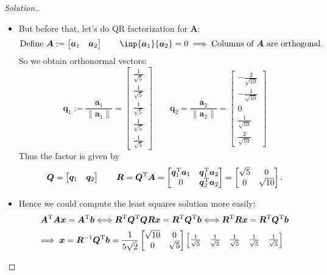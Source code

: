 \begin{enumerate}
\begin{proof}[Solution.]
\begin{itemize}
\item
But before that, let's do QR factorization for $\bm A$:
\[
\text{Define }\bm A:=\begin{bmatrix}
\bm a_1&\bm a_2
\end{bmatrix}\qquad
\inp{\bm a_1}{\bm a_2}=0
\implies
\text{Columns of $\bm A$ are orthogonal.}
\]
So we obtain orthonormal vectors:
\[
\bm q_1:=\frac{\bm a_1}{\|\bm a_1\|}=\begin{bmatrix}
\frac{1}{\sqrt{5}}\\\frac{1}{\sqrt{5}}\\\frac{1}{\sqrt{5}}\\\frac{1}{\sqrt{5}}\\\frac{1}{\sqrt{5}}
\end{bmatrix}\qquad
\bm q_2=\frac{\bm a_2}{\|\bm a_2\|}=\begin{bmatrix}
-\frac{2}{\sqrt{10}}\\-\frac{1}{\sqrt{10}}\\0\\\frac{1}{\sqrt{10}}\\\frac{2}{\sqrt{10}}
\end{bmatrix}
\]
Thus the factor is given by
\[
\bm Q=\begin{bmatrix}
\bm q_1&\bm q_2
\end{bmatrix}\qquad
\bm R=\bm Q^{\mathrm T}\bm A=\begin{bmatrix}
\bm q_1^{\mathrm T}\bm a_1&\bm q_1^{\mathrm T}\bm a_2\\0&\bm q_2^{\mathrm T}\bm a_2
\end{bmatrix}=\begin{bmatrix}
\sqrt{5}&0\\0&\sqrt{10}
\end{bmatrix}.
\]
\item
Hence we could compute the least squares solution more easily:
\[
\bm A^{\mathrm T}\bm A\bm x=\bm A^{\mathrm T}\bm b\Longleftrightarrow
\bm R^{\mathrm T}\bm Q^{\mathrm T}\bm Q\bm R\bm x=\bm R^{\mathrm T}\bm Q^{\mathrm T}\bm b\Longleftrightarrow\bm R^{\mathrm T}\bm R\bm x=\bm R^{\mathrm T}\bm Q^{\mathrm T}\bm b
\]
\begin{align*}
\implies\bm x=\bm R^{-1}\bm Q^{\mathrm T}\bm b&=\frac{1}{5\sqrt{2}}\begin{bmatrix}
\sqrt{10}&0\\0&\sqrt{5}
\end{bmatrix}\begin{bmatrix}
\frac{1}{\sqrt{5}}&\frac{1}{\sqrt{5}}&\frac{1}{\sqrt{5}}&\frac{1}{\sqrt{5}}&\frac{1}{\sqrt{5}}\\

\end{bmatrix}
\end{align*}
\end{itemize}
\end{proof}
\end{enumerate}
